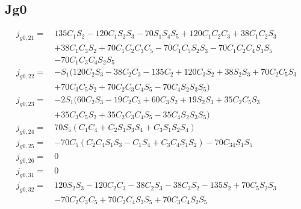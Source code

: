 \subsection{ Jg0 }
\begin{equation*}
\begin{split}
j_{g0,21} =\  &135C_1S_2 - 120C_1S_2S_3 - 70S_1S_4S_5 + 120C_1C_2C_3 + 38C_1C_2S_3\\
			  & + 38C_1C_3S_2 + 70C_1C_2C_3C_5 - 70C_1C_5S_2S_3 - 70C_1C_2C_4S_3S_5\\
		 	  & - 70C_1C_3C_4S_2S_5\\
j_{g0,22} =\  &-S_1(120C_2S_3 - 38C_2C_3 - 135C_2 + 120C_3S_2 + 38S_2S_3 + 70C_2C_5S_3\\
		   	  &+ 70C_3C_5S_2 + 70C_2C_3C_4S_5 - 70C_4S_2S_3S_5)\\
j_{g0,23} =\  &-2S_1(60C_2S_3 - 19C_2C_3 + 60C_3S_2 + 19S_2S_3 + 35C_2C_5S_3\\
			  & + 35C_3C_5S_2 + 35C_2C_3C_4S_5 - 35C_4S_2S_3S_5)\\
j_{g0,24} =\  &70S_5(C_1C_4 + C_2S_1S_3S_4 + C_3S_1S_2S_4)\\
j_{g0,25} =\  &- 70C_5(C_2C_4S_1S_3 - C_1S_4 + C_3C_4S_1S_2) - 70C_{34}S_1S_5\\
j_{g0,26} =\  &0\\
j_{g0,31} =\  &0\\
j_{g0,32} =\  &120S_2S_3 - 120C_2C_3 - 38C_2S_3 - 38C_3S_2 - 135S_2 + 70C_5S_2S_3\\
			  & - 70C_2C_3C_5+ 70C_2C_4S_3S_5 + 70C_3C_4S_2S_5\\
\end{split}
\end{equation*}
